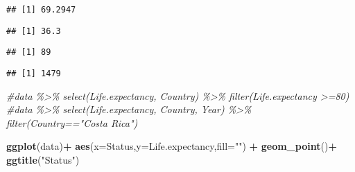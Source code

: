 \documentclass[
]{article}
\newenvironment{Shaded}{\begin{snugshade}}{\end{snugshade}}
\newcommand{\AttributeTok}[1]{\textcolor[rgb]{0.13,0.29,0.53}{#1}}
\newcommand{\CommentTok}[1]{\textcolor[rgb]{0.56,0.35,0.01}{\textit{#1}}}
\newcommand{\DecValTok}[1]{\textcolor[rgb]{0.00,0.00,0.81}{#1}}
\newcommand{\FunctionTok}[1]{\textcolor[rgb]{0.13,0.29,0.53}{\textbf{#1}}}
\newcommand{\NormalTok}[1]{#1}
\newcommand{\SpecialCharTok}[1]{\textcolor[rgb]{0.81,0.36,0.00}{\textbf{#1}}}
\newcommand{\StringTok}[1]{\textcolor[rgb]{0.31,0.60,0.02}{#1}}
\begin{document}
\begin{verbatim}
## [1] 69.2947
\end{verbatim}

\begin{Shaded}
\end{Shaded}

\begin{verbatim}
## [1] 36.3
\end{verbatim}

\begin{Shaded}
\end{Shaded}

\begin{verbatim}
## [1] 89
\end{verbatim}

\begin{Shaded}
\end{Shaded}

\begin{verbatim}
## [1] 1479
\end{verbatim}

\begin{Shaded}
\begin{Highlighting}[]
\CommentTok{\#data \%\textgreater{}\% select(Life.expectancy, Country) \%\textgreater{}\% filter(Life.expectancy \textgreater{}=80)}
\CommentTok{\#data \%\textgreater{}\% select(Life.expectancy, Country, Year) \%\textgreater{}\% filter(Country=="Costa Rica")}

\FunctionTok{ggplot}\NormalTok{(data)}\SpecialCharTok{+}
  \FunctionTok{aes}\NormalTok{(}\AttributeTok{x=}\NormalTok{Status,}\AttributeTok{y=}\NormalTok{Life.expectancy,}\AttributeTok{fill=}\StringTok{""}\NormalTok{) }\SpecialCharTok{+}
  \FunctionTok{geom\_point}\NormalTok{()}\SpecialCharTok{+}
  \FunctionTok{ggtitle}\NormalTok{(}\StringTok{"Status"}\NormalTok{)}
\end{Highlighting}
\end{Shaded}
\end{document}

